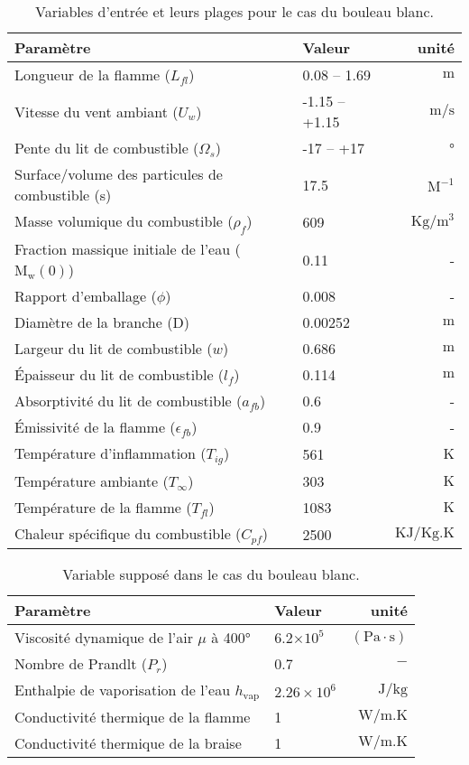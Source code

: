 \documentclass[12pt, oneside]{report} %
\theoremstyle{definition}
\theoremstyle{remark}
\begin{document}
		\clearpage
		\begin{table}[H]
			\centering
			\caption{Variables d'entrée et leurs plages pour le cas du bouleau blanc.}%
		\label{tab:donnée}
		\begin{tabular}{@{}llr@{}}
			\toprule
			Paramètre  & Valeur & unité \\
			\midrule
			Longueur de la flamme ($L_{fl}$)& 0.08 – 1.69 & $\mathrm{m}$ \\
			Vitesse du vent ambiant ($U_w$) & -1.15 – +1.15 & $\mathrm{m/s}$ \\
			Pente du lit de combustible ($\Omega_s$) & -17 – +17 & ° \\ 
			Surface/volume des particules de combustible (s)& 17.5 & $\mathrm{M^{-1}}$ \\
			Masse volumique du combustible ($\rho_f$) & 609 & $\mathrm{Kg/m^3}$ \\ 
			Fraction massique initiale de l'eau ($\mathrm{M_w}(0)$) & 0.11 & - \\ 
			Rapport d'emballage ($\phi$) & 0.008 & - \\ 
			Diamètre de la branche (D) & 0.00252 & $\mathrm{m}$ \\
			Largeur du lit de combustible ($w$) & 0.686 & $\mathrm{m}$ \\
			Épaisseur du lit de combustible ($l_f$)& 0.114 & $\mathrm{m}$ \\
			Absorptivité du lit de combustible ($a_{fb}$) & 0.6 & - \\
			Émissivité de la flamme ($\epsilon_{fb}$) & 0.9 & - \\
			Température d'inflammation ($T_{ig}$) & 561 & $\mathrm{K}$ \\
			Température ambiante ($T_{\infty}$)& 303 & $\mathrm{K}$\\ 
			Température de la flamme ($T_{fl}$) & 1083 & $\mathrm{K}$ \\
			Chaleur spécifique du combustible ($C_{pf}$) &  2500 & $\mathrm{KJ/Kg.K}$ \\
			\bottomrule
		\end{tabular}
		\end{table}
		\begin{table}[H]
		\centering
		\caption{Variable supposé dans le cas du bouleau blanc.}
		\label{tab:donnée_manquante}
		\begin{tabular}{@{}llr@{}}
			\toprule
			Paramètre  & Valeur & unité \\
			\midrule
			Viscosité dynamique de l'air $\mu$ à 400° & 6.2$\times10^5$ & $\mathrm{(Pa·s) }$ \\
			Nombre de Prandlt ($P_r$) & 0.7 &  $\mathrm{-}$ \\
			Enthalpie de vaporisation de l'eau $h_{\text{vap}}$ & $2.26 \times10^{6}$ &  $\mathrm{J/kg}$\\ 
			Conductivité thermique de la flamme & 1 & $\mathrm{W/m.K}$ \\
			Conductivité thermique de la braise & 1 & $\mathrm{W/m.K}$ \\
			\bottomrule
		\end{tabular}
		\end{table}
		\clearpage
		
\end{document}
